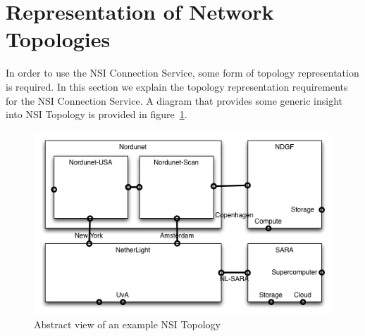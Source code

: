 \documentclass[12pt]{article}  %
\begin{document}
\tableofcontents

\newcommand{\qq}{\symbol{34}} %
\newcommand{\q}{\symbol{39}} %
\newcommand{\underscore}{\symbol{95}} %

\newcommand{\MUST}{\textsc{must}}
\newcommand{\MUSTNOT}{\textsc{must not}}
\newcommand{\REQUIRED}{\textsc{required}}
\newcommand{\SHALL}{\textsc{shall}}
\newcommand{\SHALLNOT}{\textsc{shall not}}
\newcommand{\SHOULD}{\textsc{should}}
\newcommand{\SHOULDNOT}{\textsc{should not}}
\newcommand{\RECOMMENDED}{\textsc{recommended}}
\newcommand{\MAY}{\textsc{may}}
\newcommand{\OPTIONAL}{\textsc{optional}}

\newpage

\section{Representation of Network Topologies}\label{sec:representation}

In order to use the NSI Connection Service, some form of topology representation 
is required. In this section we explain the topology representation requirements for the NSI Connection Service. A diagram that provides some generic insight into NSI Topology is provided in figure~\ref{fig:ndgf}.

\begin{figure}[htbp]
\begin{center}
\includegraphics[width=390pt]{image00.png}
\caption{Abstract view of an example NSI Topology}\label{fig:ndgf}
\end{center}
\end{figure}
\end{document}
